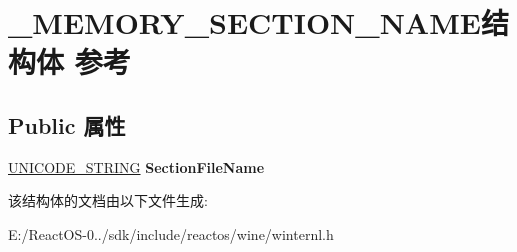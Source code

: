 \hypertarget{struct___m_e_m_o_r_y___s_e_c_t_i_o_n___n_a_m_e}{}\section{\+\_\+\+M\+E\+M\+O\+R\+Y\+\_\+\+S\+E\+C\+T\+I\+O\+N\+\_\+\+N\+A\+M\+E结构体 参考}
\label{struct___m_e_m_o_r_y___s_e_c_t_i_o_n___n_a_m_e}
\subsection*{Public 属性}
\begin{DoxyCompactItemize}
\item 
\mbox{\label{struct___m_e_m_o_r_y___s_e_c_t_i_o_n___n_a_m_e_ab8bd7f62573d0f43e8b8d869468e3d0b}} 
\hyperlink{struct___u_n_i_c_o_d_e___s_t_r_i_n_g}{U\+N\+I\+C\+O\+D\+E\+\_\+\+S\+T\+R\+I\+NG} {\bfseries Section\+File\+Name}
\end{DoxyCompactItemize}


该结构体的文档由以下文件生成\+:\begin{DoxyCompactItemize}
\item 
E\+:/\+React\+O\+S-\/0../sdk/include/reactos/wine/winternl.\+h\end{DoxyCompactItemize}
